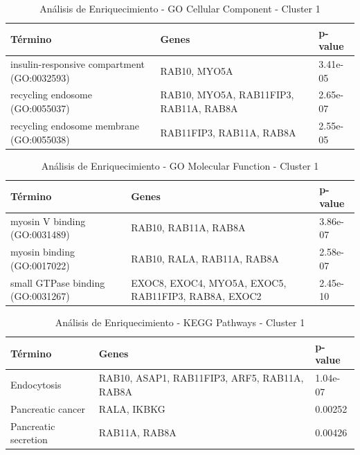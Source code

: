 \begin{table}[H]
	\centering
	\caption{Análisis de Enriquecimiento - GO Cellular Component - Cluster 1}
	\label{tb:c1_t2}
	\begin{tabular}{|p{4cm}|p{4cm}|p{3cm}|}
		\hline
		\textbf{Término} & \textbf{Genes} & \textbf{p-value} \\ \hline
		insulin-responsive compartment (GO:0032593) & RAB10, MYO5A & 3.41e-05 \\ \hline
		recycling endosome (GO:0055037) & RAB10, MYO5A, RAB11FIP3, RAB11A, RAB8A & 2.65e-07 \\ \hline
		recycling endosome membrane (GO:0055038) & RAB11FIP3, RAB11A, RAB8A & 2.55e-05 \\ \hline
	\end{tabular}
\end{table}

\begin{table}[H]
	\centering
	\caption{Análisis de Enriquecimiento - GO Molecular Function - Cluster 1}
	\label{tb:c1_t3}
	\begin{tabular}{|p{4cm}|p{4cm}|p{3cm}|}
		\hline
		\textbf{Término} & \textbf{Genes} & \textbf{p-value} \\ \hline
		myosin V binding (GO:0031489) & RAB10, RAB11A, RAB8A & 3.86e-07 \\ \hline
		myosin binding (GO:0017022) & RAB10, RALA, RAB11A, RAB8A & 2.58e-07 \\ \hline
		small GTPase binding (GO:0031267) & EXOC8, EXOC4, MYO5A, EXOC5, RAB11FIP3, RAB8A, EXOC2 & 2.45e-10 \\ \hline
	\end{tabular}
\end{table}

\begin{table}[H]
	\centering
	\caption{Análisis de Enriquecimiento - KEGG Pathways - Cluster 1}
	\label{tb:c1_t4}
	\begin{tabular}{|p{4cm}|p{4cm}|p{3cm}|}
		\hline
		\textbf{Término} & \textbf{Genes} & \textbf{p-value} \\ \hline
		Endocytosis & RAB10, ASAP1, RAB11FIP3, ARF5, RAB11A, RAB8A & 1.04e-07 \\ \hline
		Pancreatic cancer & RALA, IKBKG & 0.00252 \\ \hline
		Pancreatic secretion & RAB11A, RAB8A & 0.00426 \\ \hline
	\end{tabular}
\end{table}


